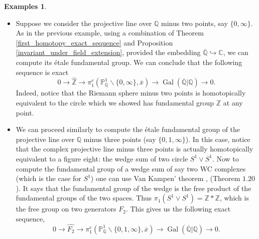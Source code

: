 \documentclass{article}
\theoremstyle{plain}
\theoremstyle{definition}
\newtheorem{examples}[theorem]{Examples}
\DeclareMathOperator{\Gal}{Gal}
\begin{document}
\begin{examples} \textbf{ }
\begin{itemize}
    \item[$a)$] Suppose we consider the projective line over $\mathbb{Q}$ minus two points, say $\{0,\infty\}$. 
    As in the previous example, using a combination of Theorem \ref{first_homotopy_exact_sequence} and Proposition \ref{invariant_under_field_extension}, provided the embedding $\overline{\mathbb{Q}}\hookrightarrow \mathbb{C}$, we can compute its \'etale fundamental group. 
    We can conclude that the following sequence is exact
    $$0\rightarrow \widehat{\mathbb{Z}}\rightarrow \pi^e_1(\mathbb{P}^1_{\mathbb{Q}} \backslash\{0,\infty\}, \overline{x}) \rightarrow \Gal(\overline{\mathbb{Q}}|\mathbb{Q})\rightarrow 0.$$
    Indeed, notice that the Riemann sphere minus two points is homotopically equivalent to the circle which we showed has fundamental group $\mathbb{Z}$ at any point.
    
    \item[$b)$] We can proceed similarly to compute the \'etale fundamental group of the projective line over $\mathbb{Q}$ minus three points (say $\{0,1,\infty\}$).
    In this case, notice that the complex projective line minus three points is actually homotopically equivalent to a figure eight: the wedge sum of two circle $S^1\vee S^1$.
    Now to compute the fundamental group of a wedge sum of say two WC complexes (which is the case for $S^1$) one can use Van Kampen' theorem \cite{Hatcher}, (Theorem $1.20$). 
    It says that the fundamental group of the wedge is the free product of the fundamental groups of the two spaces. Thus $\pi_1(S^1\vee S^1) = \mathbb{Z}*\mathbb{Z}$, which is the free group on two generators $F_2$. This gives us the following exact sequence,
     $$0\rightarrow \widehat{F_2}\rightarrow \pi^e_1(\mathbb{P}^1_{\mathbb{Q}} \backslash\{0,1,\infty\}, \overline{x}) \rightarrow \Gal(\overline{\mathbb{Q}}|\mathbb{Q})\rightarrow 0.$$
\end{itemize}
\end{examples}
\end{document}
